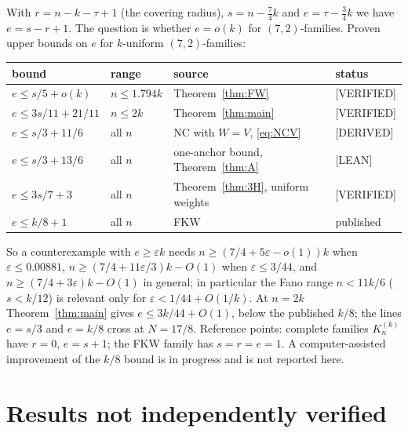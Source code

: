 \documentclass[11pt]{article}
\theoremstyle{definition}
\newcommand{\st}[1]{\textsf{\small[#1]}}
\begin{document}
With $r=n-k-\tau+1$ (the covering radius), $s=n-\tfrac74k$ and $e=\tau-\tfrac34k$ we have $e=s-r+1$. The question is
whether $e=o(k)$ for $(7,2)$-families. Proven upper bounds on $e$ for $k$-uniform $(7,2)$-families:
\begin{center}
\begin{tabular}{@{}llll@{}}
\toprule
bound & range & source & status\\
\midrule
$e\le s/5+o(k)$ & $n\le1.794k$ & Theorem~\ref{thm:FW} & \st{VERIFIED}\\
$e\le 3s/11+21/11$ & $n\le2k$ & Theorem~\ref{thm:main} & \st{VERIFIED}\\
$e\le s/3+11/6$ & all $n$ & NC with $W=V$, \eqref{eq:NCV} & \st{DERIVED}\\
$e\le s/3+13/6$ & all $n$ & one-anchor bound, Theorem~\ref{thm:A} & \st{LEAN}\\
$e\le 3s/7+3$ & all $n$ & Theorem~\ref{thm:3H}, uniform weights & \st{VERIFIED}\\
$e\le k/8+1$ & all $n$ & FKW~\cite{FKW} & published\\
\bottomrule
\end{tabular}
\end{center}
So a counterexample with $e\ge\varepsilon k$ needs $n\ge(7/4+5\varepsilon-o(1))k$ when $\varepsilon\le0.00881$,
$n\ge(7/4+11\varepsilon/3)k-O(1)$ when $\varepsilon\le3/44$, and $n\ge(7/4+3\varepsilon)k-O(1)$ in general; in particular the Fano range $n<11k/6$ ($s<k/12$) is relevant only for
$\varepsilon<1/44+O(1/k)$. At $n=2k$ Theorem~\ref{thm:main} gives $e\le3k/44+O(1)$, below the published $k/8$; the lines
$e=s/3$ and $e=k/8$ cross at $N=17/8$. Reference points: complete families $K^{(k)}_n$ have $r=0$, $e=s+1$; the FKW family
has $s=r=e=1$. A computer-assisted improvement of the $k/8$ bound is in progress and is not reported here.


\section{Results not independently verified}\label{sec:hand}
\end{document}
